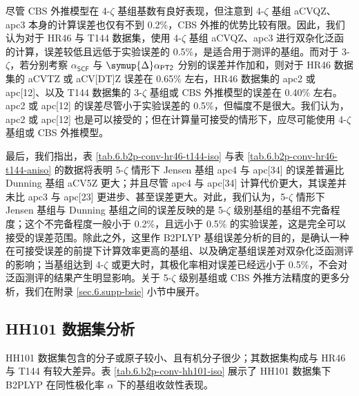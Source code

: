 尽管 CBS 外推模型在 4-$\zeta$ 基组基数有良好表现，但注意到 4-$\zeta$ 基组 aCVQZ、apc3 本身的计算误差也仅有不到 0.2\%，CBS 外推的优势比较有限。因此，我们认为对于 HR46 与 T144 数据集，使用 4-$\zeta$ 基组 aCVQZ、apc3 进行双杂化泛函的计算，误差较低且远低于实验误差的 0.5\%，是适合用于测评的基组。而对于 3-$\zeta$，若分别考察 $\alpha_\textsf{SCF}$ 与 $\symup{\Delta} \alpha_\textsf{PT2}$ 分别的误差并作加和，则对于 HR46 数据集的 aCVTZ 或 aCV[DT]Z 误差在 0.65\% 左右，HR46 数据集的 apc2 或 apc[12]、以及 T144 数据集的 3-$\zeta$ 基组或 CBS 外推模型的误差在 0.40\% 左右。apc2 或 apc[12] 的误差尽管小于实验误差的 0.5\%，但幅度不是很大。我们认为，apc2 或 apc[12] 也是可以接受的；但在计算量可接受的情形下，应尽可能使用 4-$\zeta$ 基组或 CBS 外推模型。

最后，我们指出，表 \ref{tab.6.b2p-conv-hr46-t144-iso} 与表 \ref{tab.6.b2p-conv-hr46-t144-aniso} 的数据将表明 5-$\zeta$ 情形下 Jensen 基组 apc4 与 apc[34] 的误差普遍比 Dunning 基组 aCV5Z 更大；并且尽管 apc4 与 apc[34] 计算代价更大，其误差并未比 apc3 与 apc[23] 更进步、甚至误差更大。对此，我们认为，5-$\zeta$ 情形下 Jensen 基组与 Dunning 基组之间的误差反映的是 5-$\zeta$ 级别基组的基组不完备程度；这个不完备程度一般小于 0.2\%，且远小于 0.5\% 的实验误差，这是完全可以接受的误差范围。除此之外，这里作 B2PLYP 基组误差分析的目的，是确认一种在可接受误差的前提下计算效率更高的基组、以及确定基组误差对双杂化泛函测评的影响；当基组达到 4-$\zeta$ 或更大时，其极化率相对误差已经远小于 0.5\%，不会对泛函测评的结果产生明显影响。关于 5-$\zeta$ 级别基组或 CBS 外推方法精度的更多分析，我们在附录 \ref{sec.6.supp-bsie} 小节中展开。

\subsection{HH101 数据集分析}

HH101 数据集包含的分子或原子较小、且有机分子很少；其数据集构成与 HR46 与 T144 有较大差异。表 \ref{tab.6.b2p-conv-hh101-iso} 展示了 HH101 数据集下 B2PLYP 在同性极化率 $\alpha$ 下的基组收敛性表现。

